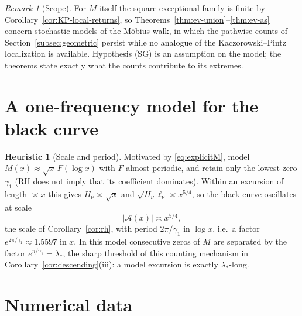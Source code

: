 \documentclass[11pt]{amsart}
\numberwithin{equation}{section}
\theoremstyle{plain}
\theoremstyle{definition}
\newtheorem{heuristic}[theorem]{Heuristic}
\theoremstyle{remark}
\newtheorem{remark}[theorem]{Remark}
\newcommand{\Anet}{\mathcal{A}}
\begin{document}
\begin{remark}[Scope]
\label{rem:ev-scope}
For $M$ itself the square-exceptional family is finite by
Corollary~\ref{cor:KP-local-returns}, so
Theorems~\ref{thm:ev-union}--\ref{thm:ev-as} concern stochastic models of
the M\"obius walk, in which the pathwise counts of
Section~\ref{subsec:geometric} persist while no analogue of the
Kaczorowski--Pintz localization is available. Hypothesis (SG) is an
assumption on the model; the theorems state exactly what the counts
contribute to its extremes.
\end{remark}


\section{A one-frequency model for the black curve}
\label{sec:model}

\begin{heuristic}[Scale and period]
\label{heu:model}
Motivated by \eqref{eq:explicitM}, model $M(x)\approx\sqrt x\,F(\log x)$
with $F$ almost periodic, and retain only the lowest zero $\gamma_1$ (RH
does not imply that its coefficient dominates). Within an excursion of
length $\asymp x$ this gives $H_\nu\asymp\sqrt x$ and
$\sqrt{H_\nu}\ell_\nu\asymp x^{5/4}$, so the black curve oscillates at scale
\begin{equation}
\label{eq:model_scale}
  |\Anet(x)|\asymp x^{5/4},
\end{equation}
the scale of Corollary~\ref{cor:rh}, with period $2\pi/\gamma_1$ in
$\log x$, i.e.\ a factor $e^{2\pi/\gamma_1}\approx1.5597$ in $x$. In this
model consecutive zeros of $M$ are separated by the factor
$e^{\pi/\gamma_1}=\lambda_*$, the sharp threshold of this counting mechanism
in Corollary~\ref{cor:descending}(iii): a model excursion is exactly
$\lambda_*$-long.
\end{heuristic}


\section{Numerical data}
\label{sec:data}
\end{document}

